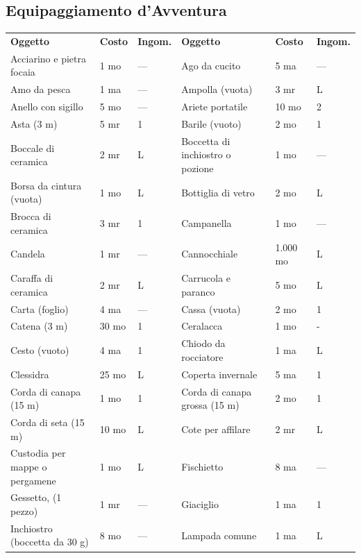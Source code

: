\documentclass[a4paper,11pt,twoside,openany]{book}
\begin{document}
\subsection{Equipaggiamento d'Avventura}\label{Equipaggiamento}

\label{equipaggiamento-davventura}



\begin{tabularx}{1\textwidth}{XllXll}
	\textbf{Oggetto}    & \textbf{Costo} & \textbf{Ingom.} & \textbf{Oggetto}    & \textbf{Costo}  & \textbf{Ingom.} \\
	Acciarino e pietra focaia   & 1 mo& —   & Ago da cucito & 5 ma& —   \\
	Amo da pesca  & 1 ma& —   & Ampolla (vuota)& 3 mr& L   \\
	Anello con sigillo  & 5 mo& —   & Ariete portatile    & 10 mo& 2   \\
	Asta (3 m)    & 5 mr& 1   & Barile (vuoto)& 2 mo& 1   \\
	Boccale di ceramica & 2 mr& L   & Boccetta di inchiostro o pozione  & 1 mo& —   \\
	Borsa da cintura (vuota)    & 1 mo& L   & Bottiglia di vetro  & 2 mo& L   \\
	Brocca di ceramica  & 3 mr& 1   & Campanella    & 1 mo& —   \\
	Candela & 1 mr& —   & Cannocchiale  & 1.000 mo  & L   \\
	Caraffa di ceramica & 2 mr& L   & Carrucola e paranco & 5 mo& L   \\
	Carta (foglio)& 4 ma& —   & Cassa (vuota) & 2 mo& 1   \\
	Catena (3 m)  & 30 mo    & 1   & Ceralacca& 1 mo& -   \\
	Cesto (vuoto) & 4 ma& 1   & Chiodo da rocciatore& 1 ma& L   \\
	Clessidra& 25 mo    & L   & Coperta invernale   & 5 ma& 1   \\
	Corda di canapa (15 m)& 1 mo& 1   & Corda di canapa grossa (15 m)& 2 mo& 1   \\
	Corda di seta (15 m)& 10 mo    & L   & Cote per affilare   & 2 mr& L   \\
	Custodia per mappe o pergamene    & 1 mo& L   & Fischietto    & 8 ma& —   \\
	Gessetto, (1 pezzo) & 1 mr& —   & Giaciglio& 1 ma& 1   \\
	Inchiostro (boccetta da 30 g)& 8 mo& —   & Lampada comune& 1 ma& L   \\

\end{tabularx}
\end{document}
